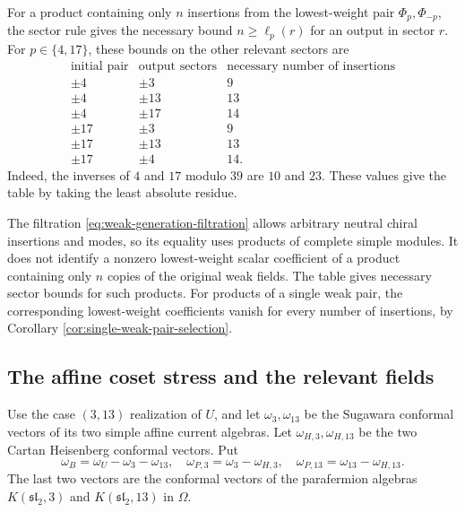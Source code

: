 \documentclass[leqno]{article}
\renewcommand{\geq}{\ensuremath{\geqslant}}
\numberwithin{equation}{section}
\begin{document}
For a product containing only $n$ insertions from the lowest-weight pair $\Phi_p,\Phi_{-p}$, the sector rule gives the necessary bound $n \geq \ell_p(r)$ for an output in sector $r$. For $p \in \{4,17\}$, these bounds on the other relevant sectors are
\begingroup
\renewcommand{\arraystretch}{1.35}
\[
\begin{array}{c|c|c}
\text{initial pair}&\text{output sectors}&\text{necessary number of insertions}\\
\hline
\pm4&\pm3&9\\
\pm4&\pm13&13\\
\pm4&\pm17&14\\
\pm17&\pm3&9\\
\pm17&\pm13&13\\
\pm17&\pm4&14.
\end{array}
\]
\endgroup
Indeed, the inverses of $4$ and $17$ modulo $39$ are $10$ and $23$. These values give the table by taking the least absolute residue.

The filtration \eqref{eq:weak-generation-filtration} allows arbitrary neutral chiral insertions and modes, so its equality uses products of complete simple modules. It does not identify a nonzero lowest-weight scalar coefficient of a product containing only $n$ copies of the original weak fields. The table gives necessary sector bounds for such products. For products of a single weak pair, the corresponding lowest-weight coefficients vanish for every number of insertions, by Corollary \ref{cor:single-weak-pair-selection}.
\subsection{The affine coset stress and the relevant fields}
\label{subsec:invariant-spectator-stress}

Use the case $(3,13)$ realization of $U$, and let $\omega_3,\omega_{13}$ be the Sugawara conformal vectors of its two simple affine current algebras. Let $\omega_{H,3},\omega_{H,13}$ be the two Cartan Heisenberg conformal vectors. Put
\[
\omega_B = \omega_U-\omega_3-\omega_{13},\quad
\omega_{P,3} = \omega_3-\omega_{H,3},\quad
\omega_{P,13} = \omega_{13}-\omega_{H,13}.
\]
The last two vectors are the conformal vectors of the parafermion algebras $K(\mathfrak{sl}_2,3)$ and $K(\mathfrak{sl}_2,13)$ in $\Omega$.
\end{document}
